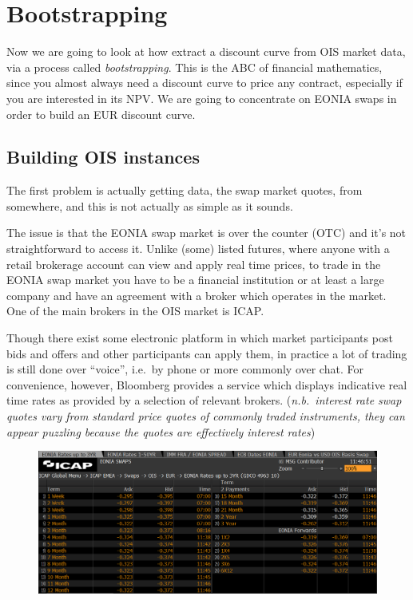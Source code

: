 \section{Bootstrapping}\label{bootstrapping}

Now we are going to look at how extract a discount curve from OIS market data, via a process called \emph{bootstrapping}. This is the ABC of financial mathematics, since you almost always need a discount curve to price any contract, especially if you are interested in its NPV. We are going to concentrate on EONIA swaps in order to build an EUR discount curve.

\subsection{Building OIS instances}\label{building-ois-instances}

The first problem is actually getting data, the swap market quotes, from somewhere, and this is not actually as simple as it sounds.

The issue is that the EONIA swap market is over the counter (OTC) and it's not straightforward to access it. Unlike (some) listed futures, where anyone with a retail brokerage account can view and apply real time prices, to trade in the EONIA swap market you have to be a financial institution or at least a large company and have an agreement with a broker which operates in the market. One of the main brokers in the OIS market is ICAP.

Though there exist some electronic platform in which market participants post bids and offers and other participants can apply them, in practice a lot of trading is still done over ``voice'', i.e.~by phone or more
commonly over chat. For convenience, however, Bloomberg provides a service which displays indicative real time rates as provided by a selection of relevant brokers. (\emph{n.b.~interest rate swap quotes vary from standard price quotes of commonly traded instruments, they can appear puzzling because the quotes are effectively interest rates})

\begin{figure}
  \centering
\includegraphics[width=0.8\linewidth]{icap_3.png}
\end{figure}

